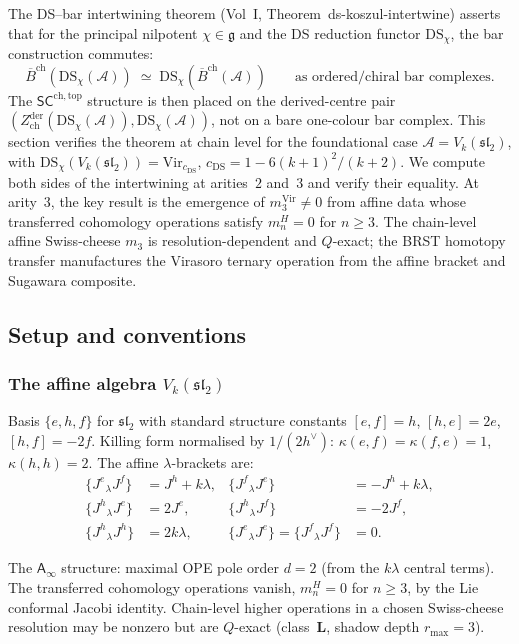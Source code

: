 \documentclass[11pt]{article}
\newcommand{\cA}{\mathcal{A}}
\newcommand{\fg}{\mathfrak{g}}
\newcommand{\fsl}{\mathfrak{sl}}
\newcommand{\barB}{\overline{B}}
\newcommand{\Ainf}{\mathsf{A}_{\infty}}
\newcommand{\SCchtop}{\mathsf{SC}^{\mathrm{ch,top}}}
\begin{document}
The DS--bar intertwining theorem (Vol~I,
Theorem~ds-koszul-intertwine) asserts that for the principal
nilpotent $\chi \in \fg$ and the DS reduction functor
$\mathrm{DS}_\chi$, the bar construction commutes:
\[
\barB^{\mathrm{ch}}(\mathrm{DS}_\chi(\cA))
\;\simeq\;
\mathrm{DS}_\chi(\barB^{\mathrm{ch}}(\cA))
\qquad
\text{as ordered/chiral bar complexes.}
\]
The $\SCchtop$ structure is then placed on the derived-centre
pair $(Z^{\mathrm{der}}_{\mathrm{ch}}(\mathrm{DS}_\chi(\cA)),
\mathrm{DS}_\chi(\cA))$, not on a bare one-colour bar complex.
This section verifies the theorem at chain level for the
foundational case $\cA = V_k(\fsl_2)$, with
$\mathrm{DS}_\chi(V_k(\fsl_2)) = \mathrm{Vir}_{c_{\mathrm{DS}}}$,
$c_{\mathrm{DS}} = 1 - 6(k+1)^2/(k+2)$.  We compute both sides of
the intertwining at arities~$2$ and~$3$ and verify their
equality.  At arity~$3$, the key result is the emergence of
$m_3^{\mathrm{Vir}} \ne 0$ from affine data whose transferred
cohomology operations satisfy $m_n^H=0$ for $n\ge3$.  The
chain-level affine Swiss-cheese $m_3$ is resolution-dependent and
$Q$-exact; the BRST homotopy transfer manufactures the Virasoro
ternary operation from the affine bracket and Sugawara composite.

\subsection{Setup and conventions}

\subsubsection*{The affine algebra $V_k(\fsl_2)$}

Basis $\{e, h, f\}$ for $\fsl_2$ with standard structure
constants $[e,f] = h$, $[h,e] = 2e$, $[h,f] = -2f$.
Killing form normalised by $1/(2h^\vee)$: $\kappa(e,f)
= \kappa(f,e) = 1$, $\kappa(h,h) = 2$.  The affine
$\lambda$-brackets are:
\begin{equation}\label{eq:wn-ds-affine-brackets}
\begin{aligned}
\{J^e{}_\lambda J^f\} &= J^h + k\lambda, &
\{J^f{}_\lambda J^e\} &= -J^h + k\lambda, \\
\{J^h{}_\lambda J^e\} &= 2J^e, &
\{J^h{}_\lambda J^f\} &= -2J^f, \\
\{J^h{}_\lambda J^h\} &= 2k\lambda, &
\{J^e{}_\lambda J^e\} = \{J^f{}_\lambda J^f\} &= 0.
\end{aligned}
\end{equation}

The $\Ainf$ structure: maximal OPE pole order $d = 2$
(from the $k\lambda$ central terms).  The transferred cohomology
operations vanish, $m_n^H=0$ for $n\ge3$, by the Lie conformal
Jacobi identity.  Chain-level higher operations in a chosen
Swiss-cheese resolution may be nonzero but are $Q$-exact
(class~$\mathbf{L}$, shadow depth $r_{\max}=3$).
\end{document}
